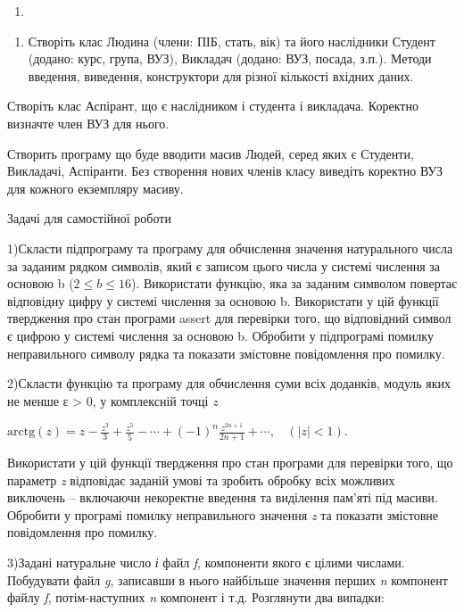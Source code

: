 \documentclass[]{article}
\begin{document}
\begin{enumerate}
\def\labelenumi{\arabic{enumi})}
\item
\end{enumerate}

\begin{enumerate}
\def\labelenumi{\arabic{enumi})}
\item
  Створіть клас Людина (члени: ПІБ, стать, вік) та його наслідники
  Студент (додано: курс, група, ВУЗ), Викладач (додано: ВУЗ, посада,
  з.п.). Методи введення, виведення, конструктори для різної кількості
  вхідних даних.
\end{enumerate}

Створіть клас Аспірант, що є наслідником і студента і викладача.
Коректно визначте член ВУЗ для нього.

Створить програму що буде вводити масив Людей, серед яких є Студенти,
Викладачі, Аспіранти. Без створення нових членів класу виведіть коректно
ВУЗ для кожного екземпляру масиву.

Задачі для самостійної роботи

1)Скласти підпрограму та програму для обчислення значення натурального
числа за заданим рядком символів, який є записом цього числа у системі
числення за основою b (\(2 \leq b \leq 16\)). Використати функцію, яка
за заданим символом повертає відповідну цифру у системі числення за
основою b. Використати у цій функції твердження про стан програми assert
для перевірки того, що відповідний символ є цифрою у системі числення за
основою b. Обробити у підпрограмі помилку неправильного символу рядка та
показати змістовне повідомлення про помилку.

2)Скласти функцію та програму для обчислення суми всіх доданків, модуль
яких не менше ε \textgreater{} 0, у комплексній точці \emph{z}

\(\text{arctg}\left( z \right) = z - \frac{z^{3}}{3} + \frac{z^{5}}{5} - \cdots + {( - 1)}^{n}\frac{z^{2n + 1}}{2n + 1} + \cdots,\ \ \ \ (\left| z \right| < 1)\).

Використати у цій функції твердження про стан програми для перевірки
того, що параметр \emph{z} відповідає заданій умові та зробить обробку
всіх можливих виключень -- включаючи некоректне введення та виділення
пам'яті під масиви. Обробити у програмі помилку неправильного значення
\emph{z} та показати змістовне повідомлення про помилку.

3)Задані натуральне число \emph{і} файл \emph{f}, компоненти якого є
цілими числами. Побудувати файл \emph{g}, записавши в нього найбільше
значення перших \emph{n} компонент файлу \emph{f}, потім-наступних
\emph{n} компонент і т.д. Розглянути два випадки:
\end{document}
